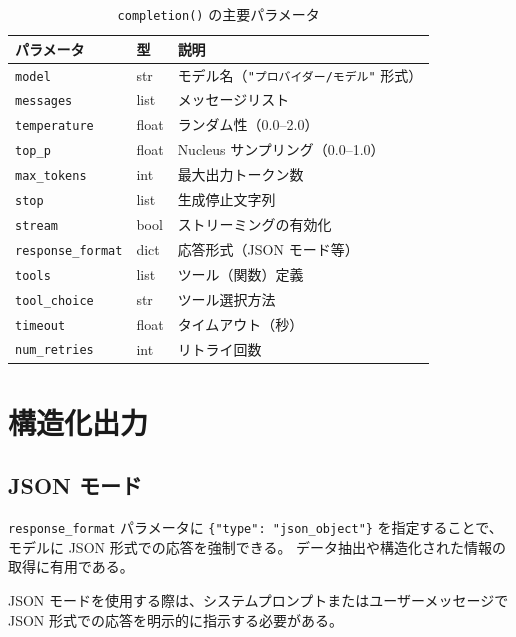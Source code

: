 \documentclass[a4paper,11pt]{ltjsarticle}
\newcommand{\code}[1]{\texttt{#1}}
\begin{document}
\begin{table}[htbp]
\centering
\caption{\code{completion()} の主要パラメータ}
\label{tab:params}
\begin{tabular}{llp{7cm}}
\toprule
パラメータ & 型 & 説明 \\
\midrule
\code{model}        & str   & モデル名（\code{"プロバイダー/モデル"} 形式） \\
\code{messages}      & list  & メッセージリスト \\
\code{temperature}   & float & ランダム性（0.0--2.0） \\
\code{top\_p}        & float & Nucleus サンプリング（0.0--1.0） \\
\code{max\_tokens}   & int   & 最大出力トークン数 \\
\code{stop}          & list  & 生成停止文字列 \\
\code{stream}        & bool  & ストリーミングの有効化 \\
\code{response\_format} & dict & 応答形式（JSON モード等） \\
\code{tools}         & list  & ツール（関数）定義 \\
\code{tool\_choice}  & str   & ツール選択方法 \\
\code{timeout}       & float & タイムアウト（秒） \\
\code{num\_retries}  & int   & リトライ回数 \\
\bottomrule
\end{tabular}
\end{table}


\section{構造化出力}
\label{sec:structured}

\subsection{JSON モード}
\label{subsec:json_mode}

\code{response\_format} パラメータに \code{\{"type": "json\_object"\}} を指定することで、モデルに JSON 形式での応答を強制できる。
データ抽出や構造化された情報の取得に有用である。



\begin{notebox}[注意]
JSON モードを使用する際は、システムプロンプトまたはユーザーメッセージで JSON 形式での応答を明示的に指示する必要がある。
\end{notebox}
\end{document}
